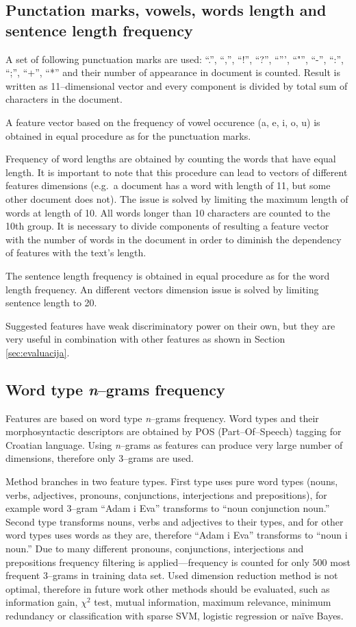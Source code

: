 \documentclass[11pt,english]{article}
\begin{document}
\begin{multicols}{2}
\subsection{Punctation marks, vowels, words length and sentence length
frequency}
\label{sec:znacajke-manje}
A set of following punctuation marks are used: ``.'', ``,'', ``!'', ``?'',
``''', ``"'', ``-'', ``:'', ``;'', ``+'', ``*'' and their number of appearance in
document is counted. Result is written as 11--dimensional vector and every
component is divided by total sum of characters in the document.

A feature vector based on the frequency of vowel occurence (a, e, i, o, u) is
obtained in equal procedure as for the punctuation marks.

Frequency of word lengths are obtained by counting the words that have equal
length. It is important to note that this procedure can lead to vectors of
different features dimensions (e.g.\ a document has a word with length of 11,
but some other document does not). The issue is solved by limiting the maximum
length of words at length of 10. All words longer than 10 characters are
counted to the 10th group. It is necessary to divide components of resulting a feature
vector with the number of words in the document in order to diminish the dependency of features with the text's length.

The sentence length frequency is obtained in equal procedure as for the word
length frequency. An different vectors dimension issue is solved by limiting
sentence length to 20.

Suggested features have weak discriminatory power on their own, but they are
very useful in combination with other features as shown in Section \ref{sec:evaluacija}.

\subsection{Word type \emph{n}--grams frequency}
\label{sec:ngrami-tipova}
Features are based on word type \emph{n}--grams frequency. Word types and their
morphosyntactic descriptors are obtained by POS (Part--Of--Speech) tagging for
Croatian language. Using \emph{n}--grams as features can produce very large
number of dimensions, therefore only 3--grams are used.

Method branches in two feature types. First type uses pure word types (nouns,
verbs, adjectives, pronouns, conjunctions, interjections and prepositions), for
example word 3--gram ``Adam i Eva'' transforms to ``noun conjunction noun.''
Second type transforms nouns, verbs and adjectives to their types, and for other
word types uses words as they are, therefore ``Adam i Eva'' transforms to
``noun i noun.'' Due to many different pronouns, conjunctions, interjections and
prepositions frequency filtering is applied---frequency is counted for only 500
most frequent 3--grams in training data set. Used dimension reduction method is
not optimal, therefore in future work other methods should be evaluated, such as
information gain, $\chi^2$ test, mutual information, maximum relevance, minimum
redundancy or classification with sparse SVM, logistic regression or na\"ive
Bayes.


\end{multicols}
\end{document}
